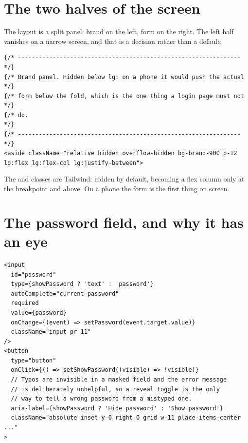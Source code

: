 
\section{The two halves of the screen}

The layout is a split panel: brand on the left, form on the right. The left half
vanishes on a narrow screen, and that is a decision rather than a default:

\begin{lstlisting}[language=tsx]
{/* ---------------------------------------------------------------- */}
{/* Brand panel. Hidden below lg: on a phone it would push the actual */}
{/* form below the fold, which is the one thing a login page must not */}
{/* do.                                                              */}
{/* ---------------------------------------------------------------- */}
<aside className="relative hidden overflow-hidden bg-brand-900 p-12 lg:flex lg:flex-col lg:justify-between">
\end{lstlisting}

The  and  classes are Tailwind: hidden by default,
becoming a flex column only at the  breakpoint and above. On a phone
the form is the first thing on screen.

\section{The password field, and why it has an eye}


\begin{lstlisting}[language=tsx]
<input
  id="password"
  type={showPassword ? 'text' : 'password'}
  autoComplete="current-password"
  required
  value={password}
  onChange={(event) => setPassword(event.target.value)}
  className="input pr-11"
/>
<button
  type="button"
  onClick={() => setShowPassword((visible) => !visible)}
  // Typos are invisible in a masked field and the error message
  // is deliberately unhelpful, so a reveal toggle is the only
  // way to tell a wrong password from a mistyped one.
  aria-label={showPassword ? 'Hide password' : 'Show password'}
  className="absolute inset-y-0 right-0 grid w-11 place-items-center ..."
>
\end{lstlisting}

